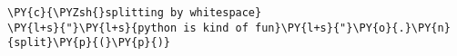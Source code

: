 \begin{Verbatim}[commandchars=\\\{\}]
\PY{c}{\PYZsh{}splitting by whitespace}
\PY{l+s}{"}\PY{l+s}{python is kind of fun}\PY{l+s}{"}\PY{o}{.}\PY{n}{split}\PY{p}{(}\PY{p}{)}
\end{Verbatim}
